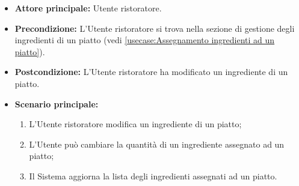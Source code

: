 \label{usecase:Modifica ingrediente di un piatto}
\begin{itemize}

	\item \textbf{Attore principale:} Utente ristoratore.

	\item \textbf{Precondizione:} L'Utente ristoratore si trova nella sezione di 
		gestione degli ingredienti di un piatto (vedi 
		\autoref{usecase:Assegnamento ingredienti ad un piatto}).

	\item \textbf{Postcondizione:} L'Utente ristoratore ha modificato un
		ingrediente di un piatto.

	\item \textbf{Scenario principale:}
	\begin{enumerate}
		\item L'Utente ristoratore modifica un ingrediente di un piatto;
		\item L'Utente può cambiare la quantità di un ingrediente assegnato ad un piatto;
		\item Il Sistema aggiorna la lista degli ingredienti assegnati ad un piatto.
	\end{enumerate}
\end{itemize}

